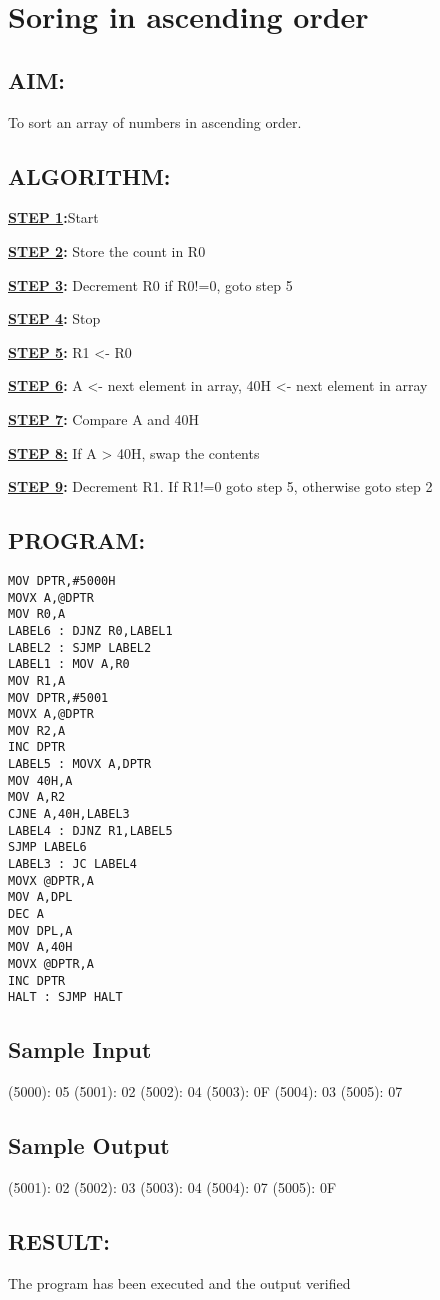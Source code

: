 \chapter{ Soring in ascending order}
%
%
%
%
\section*{AIM:}
To sort an array of numbers in ascending order.

\section*{ALGORITHM:}
\textbf{\underline{STEP 1}:}Start

\textbf{\underline{STEP 2}:} Store the count in R0

\textbf{\underline{STEP 3}:} Decrement R0 if R0!=0, goto step 5

\textbf{\underline{STEP 4}:} Stop

\textbf{\underline{STEP 5}:} R1 <- R0 

\textbf{\underline{STEP 6}:} A <- next element in array, 40H <- next element in array

\textbf{\underline{STEP 7}:} Compare A and 40H

\textbf{\underline{STEP 8:}} If A > 40H, swap the contents

\textbf{\underline{STEP 9}:} Decrement R1. If R1!=0 goto step 5, otherwise goto step 2


\section*{PROGRAM:}

\begin{lstlisting}
MOV DPTR,#5000H
MOVX A,@DPTR
MOV R0,A 
LABEL6 : DJNZ R0,LABEL1
LABEL2 : SJMP LABEL2
LABEL1 : MOV A,R0
MOV R1,A
MOV DPTR,#5001
MOVX A,@DPTR
MOV R2,A
INC DPTR
LABEL5 : MOVX A,DPTR
MOV 40H,A
MOV A,R2
CJNE A,40H,LABEL3
LABEL4 : DJNZ R1,LABEL5
SJMP LABEL6
LABEL3 : JC LABEL4
MOVX @DPTR,A
MOV A,DPL
DEC A
MOV DPL,A
MOV A,40H
MOVX @DPTR,A
INC DPTR
HALT : SJMP HALT 
\end{lstlisting}

\section*{Sample Input}
(5000): 05
(5001): 02
(5002): 04
(5003): 0F
(5004): 03
(5005): 07

\section*{Sample Output}
(5001): 02 
(5002): 03 
(5003): 04
(5004): 07
(5005): 0F

\section*{RESULT:}
The program has been executed and the output verified
%
%
%
%
